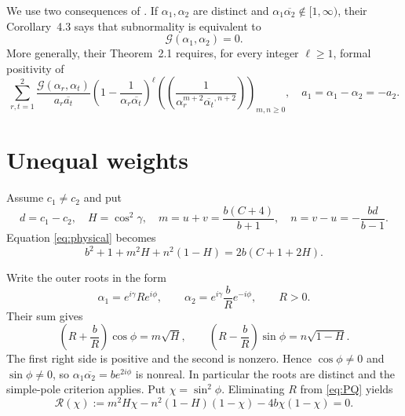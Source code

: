 \documentclass[11pt]{article}
\newcommand{\G}{\mathcal G}
\begin{document}
We use two consequences of \cite{CGR}.  If $\alpha_1,\alpha_2$ are
distinct and $\alpha_1\overline{\alpha_2}\notin[1,\infty)$, their
Corollary~4.3 says that subnormality is equivalent to
\begin{equation}\label{eq:crosszero}
 \G(\alpha_1,\alpha_2)=0.
\end{equation}
More generally, their Theorem~2.1 requires, for every integer $\ell\ge1$,
formal positivity of
\begin{equation}\label{eq:cgrmatrix}
 \sum_{r,t=1}^2
 \frac{\G(\alpha_r,\alpha_t)}{a_r\overline{a_t}}
 \left(1-\frac1{\alpha_r\overline{\alpha_t}}\right)^\ell
 \left(\!\left(\frac1{\alpha_r^{m+2}
 \overline{\alpha_t}^{,n+2}}\right)\!\right)_{m,n\ge0},
 \quad a_1=\alpha_1-\alpha_2=-a_2.
\end{equation}

\section{Unequal weights}

Assume $c_1\ne c_2$ and put
\[
 d=c_1-c_2,\quad H=\cos^2\gamma,\quad
 m=u+v=\frac{b(C+4)}{b+1},\quad
 n=v-u=-\frac{bd}{b-1}.
\]
Equation \eqref{eq:physical} becomes
\begin{equation}\label{eq:physical-mn}
 b^2+1+m^2H+n^2(1-H)=2b(C+1+2H).
\end{equation}

Write the outer roots in the form
\begin{equation}\label{eq:root-param}
 \alpha_1=e^{i\gamma}R e^{i\phi},\qquad
 \alpha_2=e^{i\gamma}\frac bR e^{-i\phi},\qquad R>0.
\end{equation}
Their sum gives
\begin{equation}\label{eq:PQ}
 \left(R+\frac bR\right)\cos\phi=m\sqrt H,\qquad
 \left(R-\frac bR\right)\sin\phi=n\sqrt{1-H}.
\end{equation}
The first right side is positive and the second is nonzero.  Hence
$\cos\phi\ne0$ and $\sin\phi\ne0$, so
$\alpha_1\overline{\alpha_2}=be^{2i\phi}$ is nonreal.  In particular the
roots are distinct and the simple-pole criterion applies.  Put
$\chi=\sin^2\phi$.  Eliminating $R$ from \eqref{eq:PQ} yields
\begin{equation}\label{eq:Rchi}
 \mathcal R(\chi):=
 m^2H\chi-n^2(1-H)(1-\chi)-4b\chi(1-\chi)=0.
\end{equation}
\end{document}
